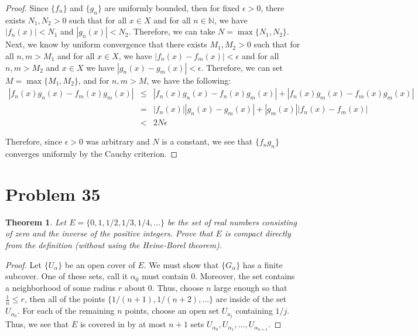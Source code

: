 \documentclass[psamsfonts]{amsart}
\newtheorem{thm}{Theorem}[section]
\theoremstyle{definition}
\theoremstyle{remark}
\numberwithin{equation}{section}
\begin{document}
\begin{proof}
Since $\{ f_n \}$ and $\{ g_n \}$ are uniformly bounded, then for fixed $\epsilon > 0$, there exists $N_1, N_2 > 0$ such that for all $x \in X$ and for all $n \in \mathbb{N}$, we have $|f_n(x)| < N_1$ and $|g_n(x)| < N_2$. Therefore, we can take $N = \max \{N_1, N_2 \}$. Next, we know by uniform convergence that there exists $M_1, M_2 >0$ such that for all $n,m > M_1$ and for all $x \in X$, we have $|f_n(x) - f_m(x)| < \epsilon$ and for all $n,m > M_2$ and $x \in X$ we have $|g_n(x) - g_m(x)| < \epsilon$. Therefore, we can set $M = \max \{M_1, M_2 \}$, and for $n,m > M$, we have the following:
\begin{eqnarray}
|f_n(x) g_n(x) - f_m(x) g_m(x) | &\leq& |f_n(x) g_n(x) - f_n(x) g_m(x)| + |f_n(x) g_m(x) - f_m(x) g_m(x)| \\
&=& |f_n(x)| |g_n(x) - g_m(x)| + |g_m(x)| |f_n(x) - f_m(x) | \\
&<& 2 N \epsilon
\end{eqnarray}

Therefore, since $\epsilon > 0$ was arbitrary and $N$ is a constant, we see that $\{ f_n g_n \}$ converges uniformly by the Cauchy criterion.
\end{proof}

\section{Problem 35}

\begin{thm}
Let $E = \{0,1, 1/2, 1/3, 1/4, \ldots \}$ be the set of real numbers consisting of zero and the inverse of the positive integers. Prove that $E$ is compact directly from the definition (without using the Heine-Borel theorem). 
\end{thm}

\begin{proof}
Let $\{U_{\alpha} \}$ be an open cover of $E$. We must show that $\{ G_{\alpha} \}$ has a finite subcover. One of these sets, call it $\alpha_0$ must contain 0. Moreover, the set contains a neighborhood of some radius $r$ about 0. Thus, choose $n$ large enough so that $\frac{1}{n} \leq r$, then all of the points $\{ 1/(n+1), 1/(n+2), \ldots \}$ are inside of the set $U_{\alpha_0}$. For each of the remaining $n$ points, choose an open set $U_{a_j}$ containing $1/j$. Thus, we see that $E$ is covered in by at most $n+1$ sets $U_{\alpha_0},U_{\alpha_1}, \ldots, U_{\alpha_{n+1}}$. 
\end{proof}
\end{document}
